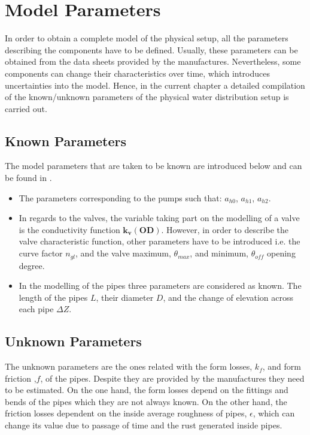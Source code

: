 \section{Model Parameters}
\label{estimateParameters}
In order to obtain a complete model of the physical setup, all the parameters describing the components have to be defined. Usually, these parameters can be 
obtained from the data sheets provided by the manufactures. Nevertheless, some components can change their characteristics over time, which introduces uncertainties 
into the model. Hence, in the current chapter a detailed compilation of the known/unknown parameters of the physical water distribution setup is carried out.

\subsection{Known Parameters}

The model parameters that are taken to be known are introduced below and can be found in .


\begin{itemize}
  \item The parameters corresponding to the pumps such that: $a_{h0}$, $a_{h1}$, $a_{h2}$. %
  
  \item In regards to the valves, the variable taking part on the modelling of a valve is the conductivity function $\pmb{k_v(OD)}$. However, in 
  order to describe the valve characteristic function, other parameters have to be introduced i.e. the curve factor $n_{gl}$, and the 
  valve maximum, $\theta_{max}$, and minimum, $\theta_{off}$ opening degree.
  
  \item In the modelling of the pipes three parameters are considered as known. The length of the pipes $L$, their diameter $D$, and the change of 
  elevation across each pipe $\Delta Z$.  
\end{itemize} 


\subsection{Unknown Parameters}
The unknown parameters are the ones related with the form losses, $k_f$, and form friction ,$f$, of the pipes. Despite they are 
provided by the manufactures they need to be estimated. On the one hand, the form losses depend on the fittings and bends of the pipes which they are not always known. 
On the other hand, the friction losses dependent on the inside average roughness of pipes, $\epsilon$, which can change its value due to passage of time 
and the rust generated inside pipes. 

